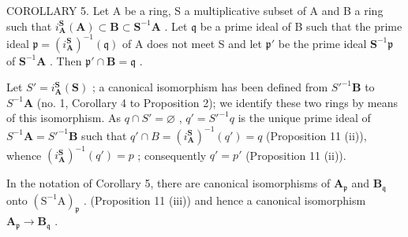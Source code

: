 COROLLARY 5. Let A be a ring, S a multiplicative subset of A and B a ring such that \(i_{\mathbf{A}}^{\mathbf{S}}(\mathbf{A}) \subset \mathbf{B} \subset \mathbf{S}^{-1}\mathbf{A}\) . Let \(\mathfrak{q}\) be a prime ideal of B such that the prime ideal \(\mathfrak{p} = (i_{\mathbf{A}}^{\mathbf{S}})^{-1}(\mathfrak{q})\) of A does not meet S and let \(\mathfrak{p}'\) be the prime ideal \(\mathbf{S}^{-1}\mathfrak{p}\) of \(\mathbf{S}^{-1}\mathbf{A}\) . Then \(\mathfrak{p}' \cap \mathbf{B} = \mathfrak{q}\) .

Let \(S' = i_{\mathbf{A}}^{\mathbf{S}}(\mathbf{S})\) ; a canonical isomorphism has been defined from \(S'^{-1}\mathbf{B}\) to \(S^{-1}\mathbf{A}\) (no. 1, Corollary 4 to Proposition 2); we identify these two rings by means of this isomorphism. As \(q \cap S' = \varnothing\) , \(q' = S'^{-1}q\) is the unique prime ideal of \(S^{-1}\mathbf{A} = S'^{-1}\mathbf{B}\) such that \(q' \cap B = (i_{\mathbf{A}}^{\mathbf{S}})^{-1}(q') = q\) (Proposition 11 (ii)), whence \((i_{\mathbf{A}}^{\mathbf{S}})^{-1}(q') = p\) ; consequently \(q' = p'\) (Proposition 11 (ii)).

In the notation of Corollary 5, there are canonical isomorphisms of \(\mathbf{A}_{\mathfrak{p}}\) and \(\mathbf{B}_{\mathfrak{q}}\) onto \((\mathrm{S}^{-1}\mathrm{A})_{\mathfrak{p}}\) . (Proposition 11 (iii)) and hence a canonical isomorphism \(\mathbf{A}_{\mathfrak{p}} \to \mathbf{B}_{\mathfrak{q}}\) .

